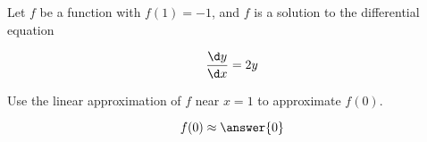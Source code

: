 \documentclass{ximera}
\author{Steven Gubkin}
\begin{document}
\begin{exercise}



Let $f$ be a function with $f(1) = -1$, and $f$ is a solution to the differential equation 

\[

\frac{\d y}{\d x} = 2y

\]

Use the linear approximation of $f$ near $x=1$ to approximate $f(0)$. 

\begin{prompt}
	\[
	f(0) \approx \answer{0}
	\]
\end{prompt}

\end{exercise}
\end{document}
